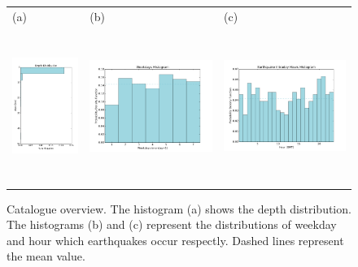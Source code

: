 \documentclass[grl]{agutex}
\begin{document}
\begin{figure}
	\begin{center}
	\begin{table}[H]
		\begin{tabular}{ p{}
						 p{}
						 p{} }
		\footnotesize(a) &
		\footnotesize(b) &
		\footnotesize(c)
		\\
		\includegraphics[height=5cm]{z_img_hmtk_bsb2014_11_depth}  &
		\includegraphics[height=5cm]{z_img_hmtk_bsb2014_11_weekday} &
		\includegraphics[height=5cm]{z_img_hmtk_bsb2014_11_hour}
		\end{tabular}
	\end{table}
	\caption{Catalogue overview. The histogram (a) shows the depth distribution. The histograms (b) and (c) represent the distributions of weekday and hour which earthquakes occur respectly. Dashed lines represent the mean value.}
	\label{fig_overview}
	\end{center}
\end{figure}
\end{document}
